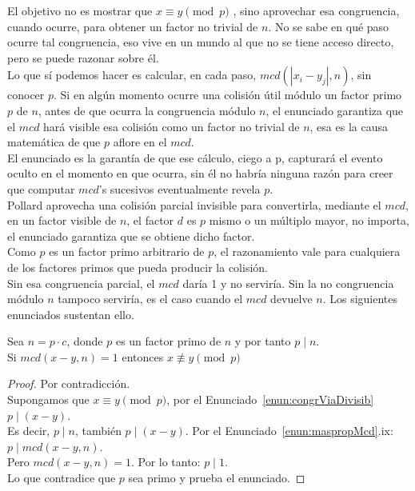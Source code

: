 El objetivo no es mostrar que $x \equiv y \pmod p$ , sino aprovechar esa congruencia, cuando ocurre, para obtener un factor no trivial de $n$. No se sabe en qué paso ocurre tal congruencia, eso vive en un mundo al que no se tiene acceso directo, pero se puede razonar sobre él. \\
Lo que sí podemos hacer es calcular, en cada paso, $mcd(|x_i - y_j|, n)$, sin conocer $p$. Si en algún momento ocurre una colisión útil módulo un factor primo $p$ de $n$, antes de que ocurra la congruencia módulo $n$, el enunciado garantiza que el $mcd$ hará visible esa colisión como un factor no trivial de $n$, esa es la causa matemática de que $p$ aflore en el $mcd$. \\
El enunciado es la garantía de que ese cálculo, ciego a p, capturará el evento oculto en el momento en que ocurra, sin él no habría ninguna razón para creer que computar $mcd$'s sucesivos eventualmente revela $p$. \\
Pollard aprovecha una colisión parcial invisible para convertirla, mediante el $mcd$, en un factor visible de $n$, el factor $d$ es $p$ mismo o un múltiplo mayor, no importa, el enunciado garantiza que se obtiene dicho factor. \\
Como $p$ es un factor primo arbitrario de $p$, el razonamiento vale para cualquiera de los factores primos que pueda producir la colisión. \\
Sin esa congruencia parcial, el $mcd$ daría 1 y no serviría.  Sin la no congruencia módulo $n$ tampoco serviría, es el caso cuando el $mcd$ devuelve $n$. Los siguientes enunciados sustentan ello.

\begin{enunciado}
\label{enun:Rhomcd1}\leavevmode\par 
Sea $n=p \cdot c$, donde $p$ es un factor primo de $n$ y por tanto $p \mid n$. \\
Si $mcd(x - y, n) = 1$ entonces $x \nequiv y \pmod{p}$
\end{enunciado}

\begin{proof} Por contradicción. \\
Supongamos que $x \equiv y \pmod{p}$, por el Enunciado~\ref{enun:congrViaDivisib} $p \mid (x - y)$. \\
Es decir, $p \mid n$, también $p \mid (x - y)$. Por el Enunciado~\ref{enun:maspropMcd}.ix: $p \mid mcd(x - y, n)$. \\
Pero $mcd(x - y, n) = 1$. Por lo tanto: $p \mid 1$. \\
Lo que contradice que $p$ sea primo y prueba el enunciado.
\end{proof}

